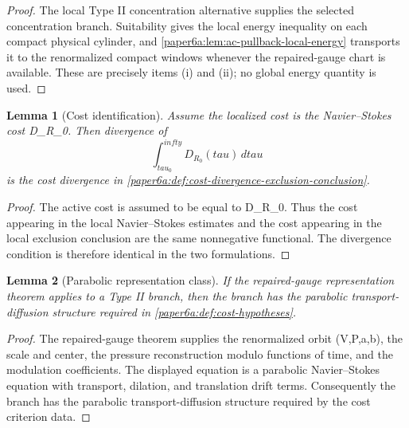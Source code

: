 \documentclass[11pt]{amsart}
\def\({}%
\def\){}%
\def\tilde#1{#1}%
\def\mathfrak#1{#1}%
\def\tau{tau}%
\def\infty{infty}%
\theoremstyle{plain}
\newtheorem{lemma}[lemma]{Lemma}
\theoremstyle{definition}
\theoremstyle{remark}
\begin{document}
\begin{proof}
The local Type II concentration alternative supplies the selected concentration
branch.  Suitability gives the local energy inequality on each compact physical
cylinder, and \cref{paper6a:lem:ac-pullback-local-energy} transports it to the
renormalized compact windows whenever the repaired-gauge chart is available.
These are precisely items \textup{(i)} and \textup{(ii)}; no global energy
quantity is used.
\end{proof}

\begin{lemma}[Cost identification]\label{paper6a:lem:cost-identification}
Assume the localized cost is the Navier--Stokes cost
\(\tilde{\mathfrak D}_{R_0}\).  Then divergence of
\[
  \int_{\tau_0}^{\infty}\tilde{\mathfrak D}_{R_0}(\tau)\,d\tau
\]
is the cost divergence in \cref{paper6a:def:cost-divergence-exclusion-conclusion}.
\end{lemma}

\begin{proof}
The active cost is assumed to be equal to
\(\tilde{\mathfrak D}_{R_0}\).  Thus the cost appearing in the local
Navier--Stokes estimates and the cost appearing in the local exclusion
conclusion are the same nonnegative functional.  The divergence condition is
therefore identical in the two formulations.
\end{proof}

\begin{lemma}[Parabolic representation class]\label{paper6a:lem:parabolic-class}
If the repaired-gauge representation theorem applies to a Type II branch, then
the branch has the parabolic transport-diffusion structure required in
\cref{paper6a:def:cost-hypotheses}.
\end{lemma}

\begin{proof}
The repaired-gauge theorem supplies the renormalized orbit \((V,P,a,b)\), the
scale and center, the pressure reconstruction modulo functions of time, and the
modulation coefficients.  The displayed equation is a parabolic
Navier--Stokes equation with transport, dilation, and translation drift terms.
Consequently the branch has the parabolic transport-diffusion structure required
by the cost criterion data.
\end{proof}
\end{document}
